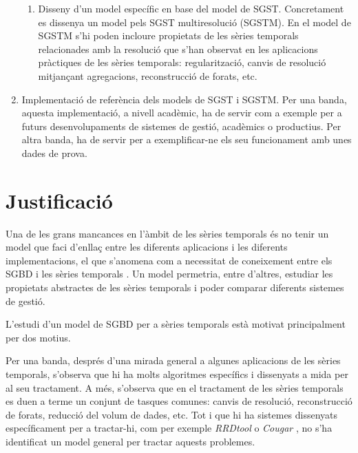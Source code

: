 \begin{enumerate}
\begin{enumerate}
  \item Disseny d'un model específic en base del model de
    SGST. Concretament es dissenya un model pels SGST multiresolució
    (SGSTM).  En el model de SGSTM s'hi poden incloure propietats de
    les sèries temporals relacionades amb la resolució que s'han
    observat en les aplicacions pràctiques de les sèries temporals:
    regularització, canvis de resolució mitjançant agregacions,
    reconstrucció de forats, etc.
  \end{enumerate}

\item Implementació de referència dels models de SGST i SGSTM. Per una
  banda, aquesta implementació, a nivell acadèmic, ha de servir com a
  exemple per a futurs desenvolupaments de sistemes de gestió,
  acadèmics o productius. Per altra banda, ha de servir per a
  exemplificar-ne els seu funcionament amb unes dades de prova.



\end{enumerate}






\section{Justificació}

Una de les grans mancances en l'àmbit de les sèries temporals és no
tenir un model que faci d'enllaç entre les diferents aplicacions i les
diferents implementacions, el que s'anomena com a necessitat de
coneixement entre els SGBD i les sèries
temporals \parencite{zhang11,stonebraker09:scidb}. Un model permetria,
entre d'altres, estudiar les propietats abstractes de les sèries
temporals i poder comparar diferents sistemes de gestió.



L'estudi d'un model de SGBD per a sèries temporals està motivat
principalment per dos motius.


Per una banda, després d'una mirada general a algunes aplicacions de
les sèries temporals, s'observa que hi ha molts algoritmes específics
i dissenyats a mida per al seu tractament. A més, s'observa que en el
tractament de les sèries temporals es duen a terme un conjunt de
tasques comunes: canvis de resolució, reconstrucció de forats,
reducció del volum de dades, etc.  Tot i que hi ha sistemes dissenyats
específicament per a tractar-hi, com per exemple
\emph{RRDtool} \parencite{rrdtool} o \emph{Cougar} \parencite{fung02},
no s'ha identificat un model general per tractar aquests problemes.


